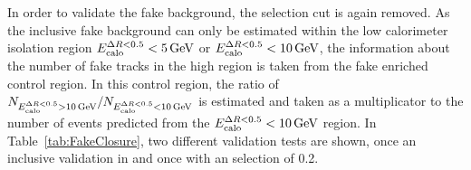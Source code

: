 In order to validate the fake background, the \nhits selection cut is again removed.
As the inclusive fake background can only be estimated within the low calorimeter isolation region $E^{\Delta R<0.5}_{\text{calo}}<5\,\text{Ge}\kern-0.06667em\text{V}$ or $E^{\Delta R<0.5}_{\text{calo}}<10\,\text{Ge}\kern-0.06667em\text{V}$, 
the information about the number of fake tracks in the high \ecalo region is taken from the fake enriched control region.
In this control region, the ratio of $N_{E^{\Delta R<0.5}_{\text{calo}}>10\,\text{Ge}\kern-0.06667em\text{V}}/N_{E^{\Delta R<0.5}_{\text{calo}}<10\,\text{Ge}\kern-0.06667em\text{V}}$ is estimated and taken as a multiplicator to the number of events predicted from the $E^{\Delta R<0.5}_{\text{calo}}<10\,\text{Ge}\kern-0.06667em\text{V}$ region.
In Table~\ref{tab:FakeClosure}, two different validation tests are shown, once an inclusive validation in \ias and once with an \ias selection of 0.2.
\renewcommand{\arraystretch}{1.4}
\begin{table}[!h]
\centering
\caption{Validation test of fake and leptonic background estimation methods (only statistical uncertainties are included). Left: $\ecalo>10\gev$ . Right: $\ecalo>10\gev$ and $\ias>0.2$}
\label{tab:FakeClosure}
\end{table}
